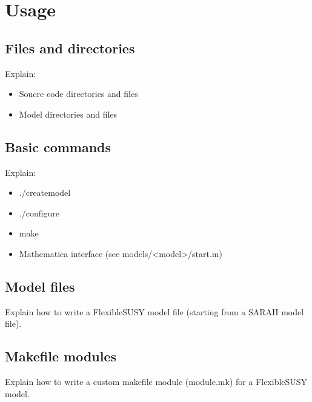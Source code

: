 \section{Usage}
\subsection{Files and directories}

Explain:
\begin{itemize}
\item Soucre code directories and files
\item Model directories and files
\end{itemize}

\subsection{Basic commands}

Explain:
\begin{itemize}
\item ./createmodel
\item ./configure
\item make
\item Mathematica interface (see models/<model>/start.m)
\end{itemize}

\subsection{Model files}

Explain how to write a FlexibleSUSY model file (starting from a SARAH
model file).

\subsection{Makefile modules}

Explain how to write a custom makefile module (module.mk) for a
FlexibleSUSY model.
